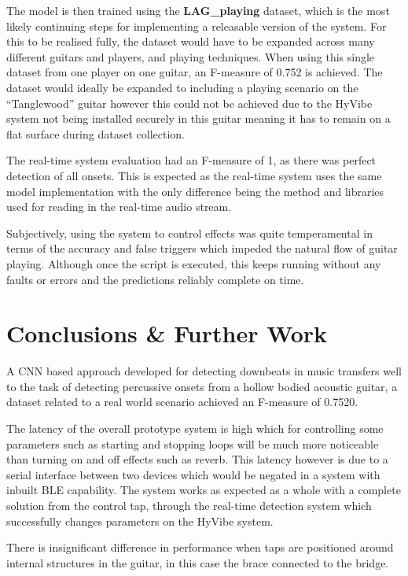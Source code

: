 \documentclass[conference]{IEEEtran}
\begin{document}
The model is then trained using the \textbf{LAG\_playing} dataset, which is the most likely continuing steps for implementing a releasable version of the system. For this to be realised fully, the dataset would have to be expanded across many different guitars and players, and playing techniques. When using this single dataset
from one player on one guitar, an F-measure of 0.752 is achieved. The dataset would ideally be expanded to including a playing scenario on the ``Tanglewood'' guitar however this could not be achieved due to the HyVibe system not being installed securely in this guitar meaning it has to remain on a flat
surface during dataset collection.

The real-time system evaluation had an F-measure of 1, as there was perfect detection of all onsets. This is expected as the real-time system uses the same model implementation with the only difference being the method and libraries used
for reading in the real-time audio stream. 

Subjectively, using the system to control effects was quite temperamental in terms of the accuracy and false triggers which impeded the natural flow of guitar playing. Although once the script is executed, this keeps running without any faults or errors and the predictions reliably complete on time.

\section{Conclusions \& Further Work}

A CNN based approach developed for detecting downbeats in music transfers well to the task of detecting percussive onsets from a hollow bodied acoustic guitar, a dataset related to a real world scenario achieved an F-measure of 0.7520.

The latency of the overall prototype system is high which for controlling some parameters such as starting and stopping loops will be much more noticeable than turning on and off effects such as reverb. This latency however is due to a serial interface between two devices which would be 
negated in a system with inbuilt BLE capability. The system works as expected as a whole with a complete solution from the control tap, through the real-time detection system which successfully changes parameters on the HyVibe system.

There is insignificant difference in performance when taps are positioned around internal structures in the guitar, in this case the brace connected to the bridge.
\end{document}
